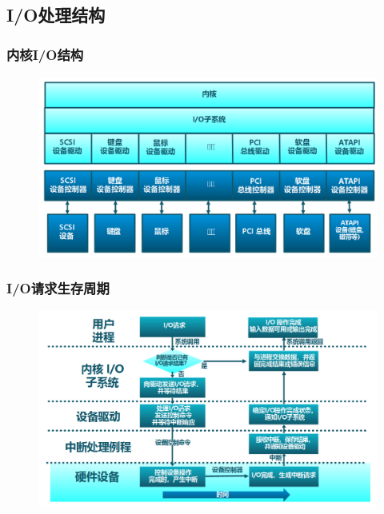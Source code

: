 \subsection{I/O处理结构} %
\begin{frame}[fragile]
    \frametitle{内核I/O结构}
    \begin{figure}
    \includegraphics[width=0.8\linewidth]{figs/os-io-arch.png}
    \end{figure}
\end{frame}

\begin{frame}[fragile]
    \frametitle{I/O请求生存周期}
    \begin{figure}
        \includegraphics[width=0.8\linewidth]{figs/os-io-lifetime.png}
    \end{figure}
\end{frame}
